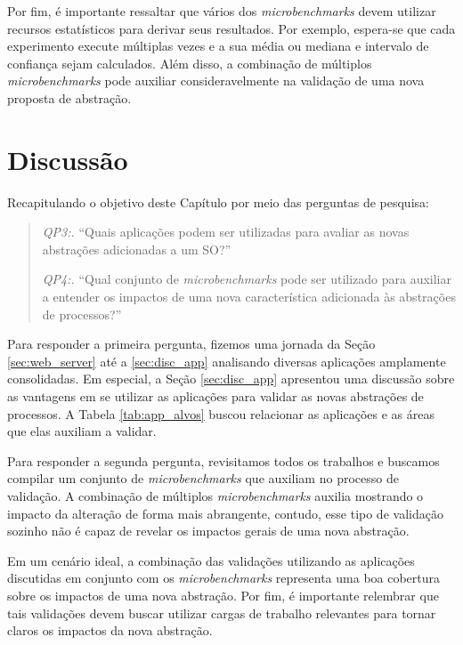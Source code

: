 Por fim, é importante ressaltar que vários dos \emph{microbenchmarks} devem
utilizar recursos estatísticos para derivar seus resultados. Por exemplo,
espera-se que cada experimento execute múltiplas vezes e a sua média ou mediana
e intervalo de confiança sejam calculados. Além disso, a combinação de
múltiplos \emph{microbenchmarks} pode auxiliar consideravelmente na validação
de uma nova proposta de abstração.

\section{Discussão}

Recapitulando o objetivo deste Capítulo por meio das perguntas de pesquisa:

\begin{quote}
  \item \emph{QP3:.} ``Quais aplicações podem ser utilizadas para avaliar as novas abstrações adicionadas a um SO?''
  \item \emph{QP4:.} ``Qual conjunto de \emph{microbenchmarks} pode ser utilizado para auxiliar a entender os impactos de uma nova característica adicionada às abstrações de processos?''
\end{quote}

Para responder a primeira pergunta, fizemos uma jornada da Seção
\ref{sec:web_server} até a \ref{sec:disc_app} analisando diversas aplicações
amplamente consolidadas. Em especial, a Seção \ref{sec:disc_app} apresentou uma
discussão sobre as vantagens em se utilizar as aplicações para validar as novas
abstrações de processos. A Tabela \ref{tab:app_alvos} buscou relacionar as
aplicações e as áreas que elas auxiliam a validar.

Para responder a segunda pergunta, revisitamos todos os trabalhos e buscamos
compilar um conjunto de \emph{microbenchmarks} que auxiliam no processo de
validação.  A combinação de múltiplos \emph{microbenchmarks} auxilia
mostrando o impacto da alteração de forma mais abrangente, contudo, esse tipo
de validação sozinho não é capaz de revelar os impactos gerais de uma nova
abstração.

Em um cenário ideal, a combinação das validações utilizando as aplicações
discutidas em conjunto com os \emph{microbenchmarks} representa uma boa
cobertura sobre os impactos de uma nova abstração. Por fim, é importante
relembrar que tais validações devem buscar utilizar cargas de trabalho
relevantes para tornar claros os impactos da nova abstração.

